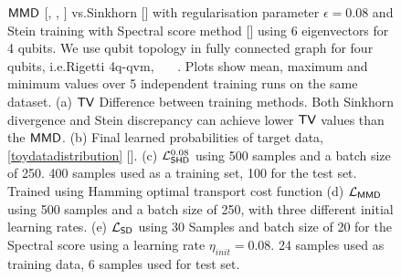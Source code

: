 \begin{figure}
\begin{subfigure}[t]{0.35\textwidth}
        \caption{}
        \label{subfig:stein_4_qubits}
    \end{subfigure}
    \caption{$\operatorname{\textsf{MMD}}$ [\crule[cyan]{0.2cm}{0.2cm}, \crule[yellow]{0.2cm}{0.2cm}, \crule[ForestGreen]{0.2cm}{0.2cm}] vs.\@ Sinkhorn [\crule[blue]{0.2cm}{0.2cm}]  with regularisation parameter $\epsilon = 0.08$ and Stein training with Spectral score method [\crule[magenta]{0.2cm}{0.2cm}] using 6 eigenvectors for 4 qubits. We use qubit topology in fully connected graph for four qubits, i.e.\@ Rigetti {\selectfont 4q-qvm},  \protect\ \ \ . Plots show mean, maximum and minimum values over 5 independent training runs on the same dataset. (a) $\operatorname{\textsf{TV}}$ Difference between training methods. Both Sinkhorn divergence and Stein discrepancy can achieve lower $\operatorname{\textsf{TV}}$ values than the $\operatorname{\textsf{MMD}}$. (b) Final learned probabilities of target data, \eqref{toydatadistribution} [\crule[black]{0.2cm}{0.2cm}]. (c) $\mathcal{L}^{0.08}_{\operatorname{\textsf{SHD}}}$ using 500 samples and a batch size of 250. 400 samples used as a training set, 100 for the test set. Trained using Hamming optimal transport cost function (d) $\mathcal{L}_{\operatorname{\textsf{MMD}}}$ using 500 samples and a batch size of 250, with three different initial learning rates. (e) $\mathcal{L}_{\operatorname{\textsf{SD}}}$ using 30 Samples and batch size of 20 for the Spectral score using a learning rate $\eta_{init}=0.08$. 24 samples used as training data, 6 samples used for test set.}\label{fig:MMDvSinkvStein4}
\end{figure}

